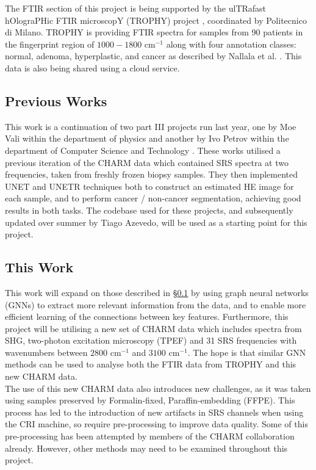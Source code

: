 The FTIR section of this project is being supported by the ulTRafast hOlograPHic FTIR microscopY (TROPHY) project \cite{noauthor_ultrafast_2022}, coordinated by Politecnico di Milano. TROPHY is providing FTIR spectra for samples from 90 patients in the fingerprint region of $1000-1800 \text{ cm}^{-1}$ along with four annotation classes: normal, adenoma, hyperplastic, and cancer as described by Nallala et al. \cite{nallala_high-resolution_2016}. This data is also being shared using a cloud service.  %

\subsection{Previous Works} \label{sec:prev_works}
This work is a continuation of two part III projects run last year, one by Moe Vali within the department of physics \cite{vali_deep_2024} and another by Ivo Petrov within the department of Computer Science and Technology \cite{petrov_diagnosing_2024}. These works utilised a previous iteration of the CHARM data which contained SRS spectra at two frequencies, taken from freshly frozen biopsy samples. They then implemented UNET and UNETR techniques both to construct an estimated HE image for each sample, and to perform cancer / non-cancer segmentation, achieving good results in both tasks. The codebase used for these projects, and subsequently updated over summer by Tiago Azevedo, will be used as a starting point for this project.

\subsection{This Work}
\noindent
This work will expand on those described in §\ref{sec:prev_works} by using graph neural networks (GNNs) to extract more relevant information from the data, and to enable more efficient learning of the connections between key features. Furthermore, this project will be utilising a new set of CHARM data which includes spectra from SHG, two-photon excitation microscopy (TPEF) and 31 SRS frequencies with wavenumbers between $2800 \text{ cm}^{-1}$ and $3100 \text{ cm}^{-1}$. The hope is that similar GNN methods can be used to analyse both the FTIR data from TROPHY and this new CHARM data.\\

The use of this new CHARM data also introduces new challenges, as it was taken using samples preserved by Formalin-fixed, Paraffin-embedding (FFPE). This process has led to the introduction of new artifacts in SRS channels when using the CRI machine, so require pre-processing to improve data quality. Some of this pre-processing has been attempted by members of the CHARM collaboration already. However, other methods may need to be examined throughout this project.\\

